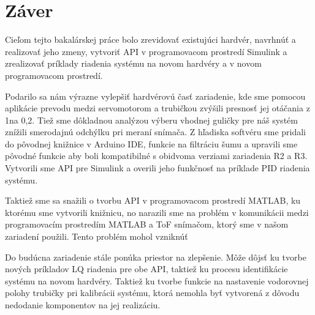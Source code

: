 \chapter{Záver}

Cieľom tejto bakalárskej práce bolo zrevidovať existujúci hardvér, navrhnúť a realizovať jeho zmeny, vytvoriť API v programovacom prostredí Simulink a zrealizovať príklady riadenia systému na novom hardvéry a v novom programovacom prostredí. 

Podarilo sa nám výrazne vylepšiť hardvérovú časť zariadenie, kde sme pomocou aplikácie prevodu medzi servomotorom a trubičkou zvýšili presnosť jej otáčania z 1\degree na 0,2\degree. Tiež sme dôkladnou analýzou výberu vhodnej guličky pre náš systém znížili smerodajnú odchýlku pri meraní snímača. Z hľadiska softvéru sme pridali do pôvodnej knižnice v Arduino IDE, funkcie na filtráciu šumu a upravili sme pôvodné funkcie aby boli kompatibilné s obidvoma verziami zariadenia R2 a R3. Vytvorili sme API pre Simulink a overili jeho funkčnosť na príklade PID riadenia systému.

Taktiež sme sa snažili o tvorbu API v programovacom prostredí MATLAB, ku ktorému sme vytvorili knižnicu, no narazili sme na problém v  komunikácii medzi programovacím prostredím MATLAB a ToF snímačom, ktorý sme v našom zariadení použili. Tento problém mohol vzniknúť 

Do budúcna zariadenie stále ponúka priestor na zlepšenie. Môže dôjsť ku tvorbe nových príkladov LQ riadenia pre obe API, taktiež ku procesu identifikácie systému na novom hardvéry. Taktiež ku tvorbe funkcie na nastavenie vodorovnej polohy trubičky pri kalibrácii systému, ktorá nemohla byť vytvorená z dôvodu nedodanie komponentov na jej realizáciu.

